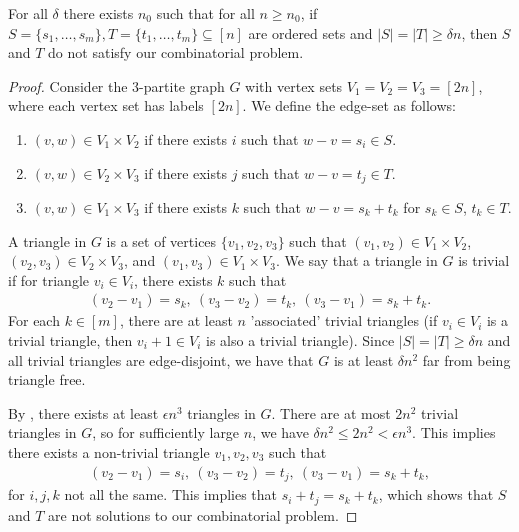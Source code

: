 \begin{theorem}
	For all $\delta$ there exists $n_0$ such that for all $n \geq n_0$, if $S=\{s_1,\dotsc,s_m\},T=\{t_1,\dotsc,t_m\} \subseteq [n]$ are ordered sets and $|S| = |T| \geq \delta n$, then $S$ and $T$ do not satisfy our combinatorial problem.
\end{theorem}
\begin{proof}
	Consider the 3-partite graph $G$ with vertex sets $V_1 = V_2 = V_3 = [2n]$, where each vertex set has labels $[2n]$. We define the edge-set as follows:
	\begin{enumerate}
		\item $(v,w) \in V_1 \times V_2$ if there exists $i$ such that $w-v = s_i \in S$.
		\item $(v,w) \in V_2 \times V_3$ if there exists $j$ such that $w-v = t_j \in T$.
		\item $(v,w) \in V_1 \times V_3$ if there exists $k$ such that $w-v = s_k + t_k$ for $s_k \in S$, $t_k \in T$.
	\end{enumerate}
	A triangle in $G$ is a set of vertices $\{v_1, v_2, v_3\}$ such that $(v_1,v_2) \in V_1 \times V_2$, $(v_2,v_3) \in V_2\times V_3$, and $(v_1,v_3) \in V_1\times V_3$. We say that a triangle in $G$ is trivial if for triangle $v_i \in V_i$, there exists $k$ such that
	\begin{align*}
		(v_2 - v_1) = s_k,\ (v_3-v_2) = t_k,\ (v_3-v_1) = s_k+t_k.
	\end{align*}
	For each $k \in [m]$, there are at least $n$ 'associated' trivial triangles (if $v_i \in V_i$ is a trivial triangle, then $v_i + 1 \in V_i$ is also a trivial triangle). Since $|S| = |T| \geq \delta n$ and all trivial triangles are edge-disjoint, we have that $G$ is at least $\delta n^2$ far from being triangle free.
	
	By , there exists at least $\epsilon n^3$ triangles in $G$. There are at most $2n^2$ trivial triangles in $G$, so for sufficiently large $n$, we have $\delta n^2 \leq 2n^2 < \epsilon n^3$. This implies there exists a non-trivial triangle $v_1, v_2, v_3$ such that
	\begin{align*}
		(v_2 - v_1) = s_i,\ (v_3 - v_2) = t_j,\ (v_3 - v_1) = s_k + t_k,
	\end{align*}
	for $i,j,k$ not all the same. This implies that $s_i + t_j = s_k + t_k$, which shows that $S$ and $T$ are not solutions to our combinatorial problem.
\end{proof}

